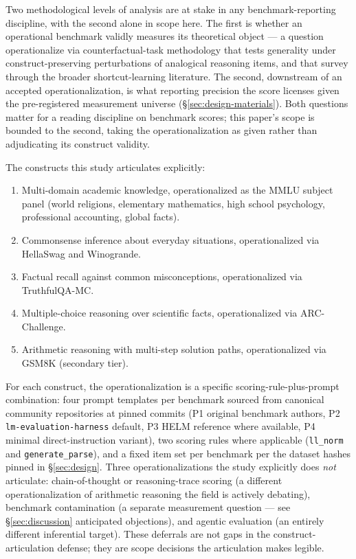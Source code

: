 \documentclass[11pt]{article}
\begin{document}
Two methodological levels of analysis are at stake in any
benchmark-reporting discipline, with the second alone in scope here.
The first is whether an operational benchmark validly measures its
theoretical object --- a question \citet{lewis2024counterfactual}
operationalize via counterfactual-task methodology that tests
generality under construct-preserving perturbations of analogical
reasoning items, and that \citet{mitchell2023debate} survey through
the broader shortcut-learning literature. The second, downstream of
an accepted operationalization, is what reporting precision the
score licenses given the pre-registered measurement universe
(§\ref{sec:design-materials}). Both questions matter for a reading
discipline on benchmark scores; this paper's scope is bounded to the
second, taking the operationalization as given rather than
adjudicating its construct validity.

The constructs this study articulates explicitly:

\begin{enumerate}
  \item Multi-domain academic knowledge, operationalized as the MMLU
    subject panel (world religions, elementary mathematics, high
    school psychology, professional accounting, global facts).
  \item Commonsense inference about everyday situations, operationalized
    via HellaSwag and Winogrande.
  \item Factual recall against common misconceptions, operationalized
    via TruthfulQA-MC.
  \item Multiple-choice reasoning over scientific facts, operationalized
    via ARC-Challenge.
  \item Arithmetic reasoning with multi-step solution paths,
    operationalized via GSM8K (secondary tier).
\end{enumerate}

For each construct, the operationalization is a specific
scoring-rule-plus-prompt combination: four prompt templates per
benchmark sourced from canonical community repositories at pinned
commits (P1 original benchmark authors, P2
\texttt{lm-evaluation-harness} default, P3 HELM reference where
available, P4 minimal direct-instruction variant), two scoring
rules where applicable (\texttt{ll\_norm} and
\texttt{generate\_parse}), and a fixed item set per benchmark per
the dataset hashes pinned in §\ref{sec:design}. Three operationalizations the study explicitly
does \emph{not} articulate: chain-of-thought or reasoning-trace
scoring (a different operationalization of arithmetic reasoning the
field is actively debating), benchmark contamination (a separate
measurement question --- see §\ref{sec:discussion} anticipated
objections), and agentic evaluation (an entirely different
inferential target). These deferrals are not gaps in the
construct-articulation defense; they are scope decisions the
articulation makes legible.
\end{document}
